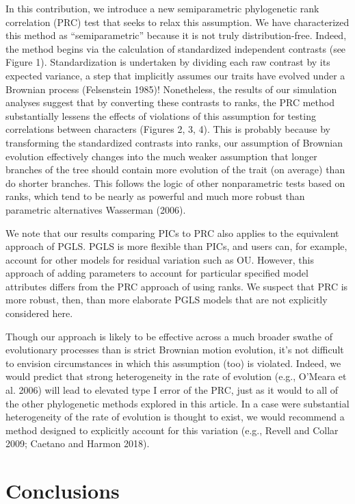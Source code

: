 \documentclass[fleqn,10pt,lineno]{wlpeerj} %
\begin{document}
In this contribution, we introduce a new semiparametric phylogenetic rank correlation (PRC) test that seeks to relax this assumption. We have characterized this method as ``semiparametric'' because it is not truly distribution-free. Indeed, the method begins via the calculation of standardized independent contrasts (see Figure 1). Standardization is undertaken by dividing each raw contrast by its expected variance, a step that implicitly assumes our traits have evolved under a Brownian process (Felsenstein 1985)! Nonetheless, the results of our simulation analyses suggest that by converting these contrasts to ranks, the PRC method substantially lessens the effects of violations of this assumption for testing correlations between characters (Figures 2, 3, 4). This is probably because by transforming the standardized contrasts into ranks, our assumption of Brownian evolution effectively changes into the much weaker assumption that longer branches of the tree should contain more evolution of the trait (on average) than do shorter branches. This follows the logic of other nonparametric tests based on ranks, which tend to be nearly as powerful and much more robust than parametric alternatives Wasserman (2006).

We note that our results comparing PICs to PRC also applies to the equivalent approach of PGLS. PGLS is more flexible than PICs, and users can, for example, account for other models for residual variation such as OU. However, this approach of adding parameters to account for particular specified model attributes differs from the PRC approach of using ranks. We suspect that PRC is more robust, then, than more elaborate PGLS models that are not explicitly considered here.

Though our approach is likely to be effective across a much broader swathe of evolutionary processes than is strict Brownian motion evolution, it's not difficult to envision circumstances in which this assumption (too) is violated. Indeed, we would predict that strong heterogeneity in the rate of evolution (e.g., O'Meara et al. 2006) will lead to elevated type I error of the PRC, just as it would to all of the other phylogenetic methods explored in this article. In a case were substantial heterogeneity of the rate of evolution is thought to exist, we would recommend a method designed to explicitly account for this variation (e.g., Revell and Collar 2009; Caetano and Harmon 2018).

\section{Conclusions}\label{conclusions}
\end{document}
